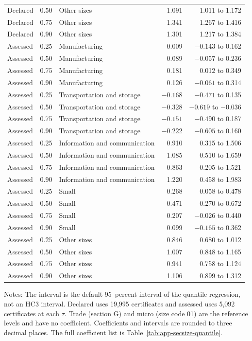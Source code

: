 \begin{longtable}{@{}lllrr@{}}
Declared & 0.50 & Other sizes & 1.091 & 1.011 to 1.172 \\
Declared & 0.75 & Other sizes & 1.341 & 1.267 to 1.416 \\
Declared & 0.90 & Other sizes & 1.301 & 1.217 to 1.384 \\
Assessed & 0.25 & Manufacturing & 0.009 & $-0.143$ to 0.162 \\
Assessed & 0.50 & Manufacturing & 0.089 & $-0.057$ to 0.236 \\
Assessed & 0.75 & Manufacturing & 0.181 & 0.012 to 0.349 \\
Assessed & 0.90 & Manufacturing & 0.126 & $-0.061$ to 0.314 \\
Assessed & 0.25 & Transportation and storage & $-0.168$ & $-0.471$ to 0.135 \\
Assessed & 0.50 & Transportation and storage & $-0.328$ & $-0.619$ to $-0.036$ \\
Assessed & 0.75 & Transportation and storage & $-0.151$ & $-0.490$ to 0.187 \\
Assessed & 0.90 & Transportation and storage & $-0.222$ & $-0.605$ to 0.160 \\
Assessed & 0.25 & Information and communication & 0.910 & 0.315 to 1.506 \\
Assessed & 0.50 & Information and communication & 1.085 & 0.510 to 1.659 \\
Assessed & 0.75 & Information and communication & 0.863 & 0.205 to 1.521 \\
Assessed & 0.90 & Information and communication & 1.220 & 0.458 to 1.983 \\
Assessed & 0.25 & Small & 0.268 & 0.058 to 0.478 \\
Assessed & 0.50 & Small & 0.471 & 0.270 to 0.672 \\
Assessed & 0.75 & Small & 0.207 & $-0.026$ to 0.440 \\
Assessed & 0.90 & Small & 0.099 & $-0.165$ to 0.362 \\
Assessed & 0.25 & Other sizes & 0.846 & 0.680 to 1.012 \\
Assessed & 0.50 & Other sizes & 1.007 & 0.848 to 1.165 \\
Assessed & 0.75 & Other sizes & 0.941 & 0.758 to 1.124 \\
Assessed & 0.90 & Other sizes & 1.106 & 0.899 to 1.312 \\
\end{longtable}

\vspace{-0.6em}
\begin{minipage}{0.95\textwidth}
\footnotesize
Notes: The interval is the default 95~percent interval of the quantile regression, not an HC3 interval. Declared uses 19,995 certificates and assessed uses 5,092 certificates at each $\tau$. Trade (section G) and micro (size code 01) are the reference levels and have no coefficient. Coefficients and intervals are rounded to three decimal places. The full coefficient list is Table~\ref{tab:app-secsize-quantile}.
\end{minipage}
